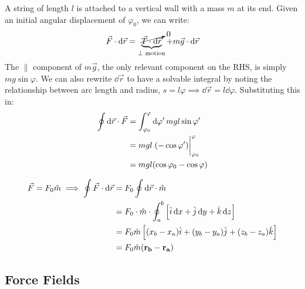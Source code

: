 \documentclass[12pt]{article}
\begin{document}
\begin{example}
  A string of length $l$ is attached to a vertical wall with a mass $m$ at its end. Given an initial angular displacement of $\varphi_0$, we can write:
  \begin{align*}
    \vec{F} \cdot \dd{\vec{r}} &= \underbrace{\cancelto{0}{\vec{T}\cdot \dd{\vec{r}}}}_{\perp \text{ motion}} + m \vec{g} \cdot \dd{\vec{r}}\\
  \end{align*}
  The $\parallel$ component of $m\vec{g}$, the only relevant component on the RHS, is simply $m g \sin \varphi$. We can also rewrite $\dd{\vec{r}}$ to have a solvable integral by noting the relationship between arc length and radius, $s = l \varphi \implies \dd{\vec{r}} = l \dd{\varphi}$. Substituting this in:
  \begin{align*}
    \oint \dd{\vec{r}}\cdot \vec{F} &= \int_{\varphi_0}^\varphi \dd{\varphi'} m g l \sin \varphi'\\
    &= mgl \eval{(-\cos \varphi')}_{\varphi_0}^{\varphi}\\
    &= mgl(\cos \varphi_0 - \cos \varphi)
  \end{align*}
\end{example}

\begin{example}
  \begin{align*}
    \vec{F} = F_0 \hat{m} \implies \oint \vec{F} \cdot \dd{\vec{r}} &= F_0 \oint \dd{\vec{r}}\cdot \hat{m}\\
    &= F_0 \cdot \hat{m} \cdot \oint_a^b \left[\hat{i} \dd{x} + \hat{j} \dd{y} + \hat{k} \dd{z}\right]\\
    &= F_0 \hat{m}\left[(x_b-x_a)\hat{i} + (y_b-y_a)\hat{j} + (z_b-z_a)\hat{k}\right]\\
    &= F_0 \hat{m}(\vb{r_b} - \vb{r_a})
  \end{align*}
\end{example}


\subsection{Force Fields}
\end{document}
